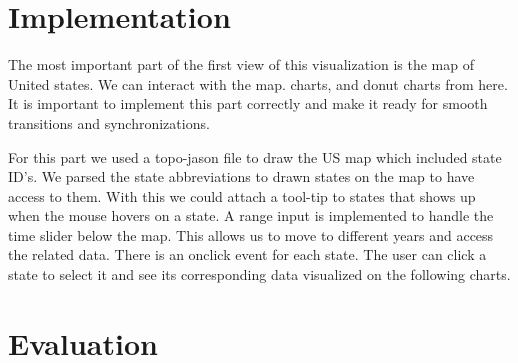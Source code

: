 \documentclass[12pt]{article}
\begin{document}
\section{Implementation}
The most important part of the first view of this visualization is the map of United states. We can interact with the map. charts, and donut charts from here. It is important to implement this part correctly and make it ready for smooth transitions and synchronizations.

For this part we used a topo-jason file to draw the US map which included state ID's. We parsed the state abbreviations to drawn states on the map to have access to them. With this we could attach a tool-tip to states that shows up when the mouse hovers on a state. A range input is implemented to handle the time slider below the map. This allows us to move to different years and access the related data. There is an onclick event for each state. The user can click a state to select it and see its corresponding data visualized on the following charts.

\section{Evaluation}



 

\end{document}
